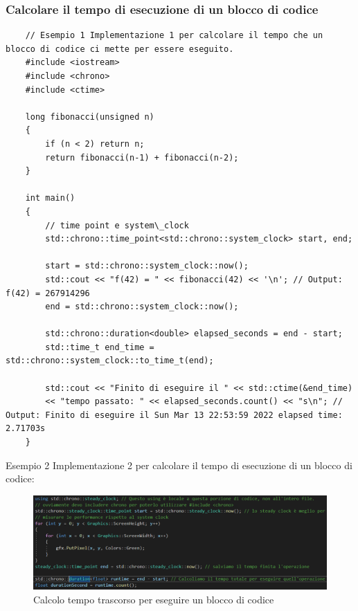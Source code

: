 \subsubsection{Calcolare il tempo di esecuzione di un blocco di codice}

\begin{lstlisting}
	// Esempio 1 Implementazione 1 per calcolare il tempo che un blocco di codice ci mette per essere eseguito.
	#include <iostream>
	#include <chrono>
	#include <ctime>
	
	long fibonacci(unsigned n)
	{
		if (n < 2) return n;
		return fibonacci(n-1) + fibonacci(n-2);
	}
	
	int main()
	{
		// time point e system\_clock
		std::chrono::time_point<std::chrono::system_clock> start, end;
		
		start = std::chrono::system_clock::now();
		std::cout << "f(42) = " << fibonacci(42) << '\n'; // Output: f(42) = 267914296
		end = std::chrono::system_clock::now();
		
		std::chrono::duration<double> elapsed_seconds = end - start;
		std::time_t end_time = std::chrono::system_clock::to_time_t(end);
		
		std::cout << "Finito di eseguire il " << std::ctime(&end_time)
		<< "tempo passato: " << elapsed_seconds.count() << "s\n"; // Output: Finito di eseguire il Sun Mar 13 22:53:59 2022 elapsed time: 2.71703s
	}
\end{lstlisting}

\textsf{\small Esempio 2 Implementazione 2 per calcolare il tempo di esecuzione di un blocco di codice: } \\

\begin{figure}[ht]
	\centering
	\includegraphics[width=1.2\textwidth, height=1.2\textheight, keepaspectratio]{./imgs/chrono_steady_clock_per_misurare_il_tempo_tra_una_operazione_e_l_altra_col_using.png}
	\caption{Calcolo tempo trascorso per eseguire un blocco di codice}
	\label{fig:chrono_steady_clock_per_misurare_il_tempo_tra_una_operazione_e_l_altra_col_using}
\end{figure}


